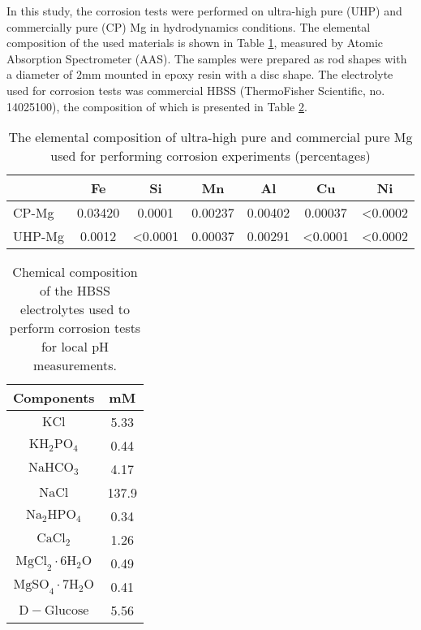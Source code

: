 
In this study, the corrosion tests were performed on ultra-high pure (\gls{UHP}) and commercially pure (\gls{CP}) Mg in hydrodynamics conditions. The elemental composition of the used materials is shown in Table \ref{tab:kinetics_alloys_composition}, measured by Atomic Absorption Spectrometer (AAS). The samples were prepared as rod shapes with a diameter of $2\text{mm}$ mounted in epoxy resin with a disc shape. The electrolyte used for corrosion tests was commercial \gls{HBSS} (ThermoFisher Scientific, no. 14025100), the composition of which is presented in Table \ref{tab:kinetics_electrolyte_composition}.


\begin{table}[t]
\caption[The elemental composition of highly-pure and commercial-pure Mg]{The elemental composition of ultra-high pure and commercial pure Mg used for performing corrosion experiments (percentages)}
\medskip
\centering
\begin{tabular}{lcccccc}
\hline & {Fe} & {Si} & {Mn} & {Al} & {Cu} & {Ni} \\
\hline { \gls{CP}-Mg } & 0.03420 & 0.0001 & 0.00237 & 0.00402 & 0.00037 & <0.0002  \\
{ \gls{UHP}-Mg } & 0.0012 & <0.0001 & 0.00037 & 0.00291 & <0.0001 & <0.0002
\end{tabular}
\label{tab:kinetics_alloys_composition}
\end{table}

\begin{table}[h]
\caption[Chemical composition of the HBSS electrolyte]{Chemical composition of the \gls{HBSS} electrolytes used to perform corrosion tests for local pH measurements.}
\medskip
\centering
\begin{tabular}{cc}
\hline
{Components} & {mM} \\
\hline
$\mathrm{KCl}$ & 5.33 \\
$\mathrm{KH}_{2} \mathrm{PO}_{4}$ & 0.44 \\
$\mathrm{NaHCO}_{3}$ & 4.17 \\
$\mathrm{NaCl}$ & 137.9 \\
$\mathrm{Na}_{2} \mathrm{HPO}_{4}$ & 0.34 \\
$\mathrm{CaCl}_{2}$ & 1.26 \\
$\mathrm{MgCl}_{2} \cdot 6 \mathrm{H}_{2} \mathrm{O}$ & 0.49 \\
$\mathrm{MgSO}_{4} \cdot 7 \mathrm{H}_{2} \mathrm{O}$ & 0.41 \\
$\mathrm{D}-\mathrm{Glucose}$ & 5.56 \\
\hline

\end{tabular}
\label{tab:kinetics_electrolyte_composition}
\end{table}

